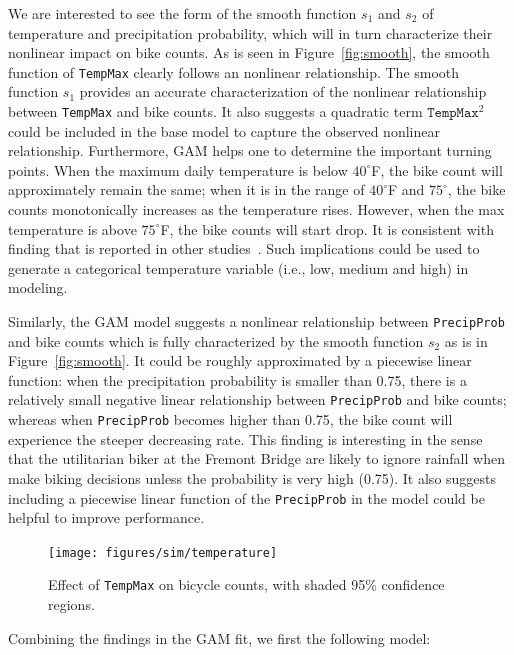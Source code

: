\documentclass [11pt, proquest] {uwthesis}[2015/03/03]
\begin{document}
We are interested to see the form of the smooth function $s_1$ and $s_2$ of temperature and precipitation probability, which will in turn characterize their nonlinear impact on bike counts. As is seen in Figure~\ref{fig:smooth}, the smooth function of \texttt{TempMax} clearly follows an nonlinear relationship. The smooth function $s_1$ provides an accurate characterization of the nonlinear relationship between \texttt{TempMax} and bike counts. It also suggests a quadratic term $\texttt{TempMax}^2$ could be included in the base model to capture the observed nonlinear relationship. Furthermore, GAM helps one to determine the important turning points. When the maximum daily temperature is below $40^{\circ}$F, the bike count will approximately remain the same; when it is in the range of $40^{\circ}$F and $75^{\circ}$, the bike counts monotonically increases as the temperature rises. However, when the max temperature is above $75^{\circ}$F, the bike counts will start drop. It is consistent with finding that is reported in other studies~\cite{Rose07,Richardson00}. Such implications could be used to generate a categorical temperature variable (i.e., low, medium and high) in modeling.

Similarly, the GAM model suggests a nonlinear relationship between \texttt{PrecipProb} and bike counts which is fully characterized by the smooth function $s_2$ as is in Figure~\ref{fig:smooth}. It could be roughly approximated by a piecewise linear function: when the precipitation probability is smaller than 0.75, there is a relatively small negative linear relationship between \texttt{PrecipProb} and bike counts; whereas when \texttt{PrecipProb} becomes higher than 0.75, the bike count will experience the steeper decreasing rate. This finding is interesting in the sense that the utilitarian biker at the Fremont Bridge are likely to ignore rainfall when make biking decisions unless the probability is very high (0.75). It also suggests including a piecewise linear function of the \texttt{PrecipProb} in the model could be helpful to improve performance.

\begin{figure}
\centering
   \texttt{[image: figures/sim/temperature]} 
  \caption{Effect of \texttt{TempMax} on bicycle counts, with shaded 95\% confidence regions.}
  \label{fig:temp}
\end{figure}

Combining the findings in the GAM fit, we first the following model:
\end{document}
